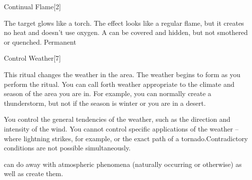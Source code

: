 \begin{spellsection}{Continual Flame}[2]
    \begin{spellheader}
    \end{spellheader}
    \begin{spellcontent}
        \begin{spelltargetinginfo}
        \end{spelltargetinginfo}
        \begin{spelleffects}

            \spelleffect The target glows like a torch. The effect looks like a regular flame, but it creates no heat and doesn't use oxygen. A  can be covered and hidden, but not smothered or quenched.
            \spelldur Permanent
        \end{spelleffects}
    \end{spellcontent}
    \begin{spellfooter}
    \end{spellfooter}
\end{spellsection}

\begin{spellsection}{Control Weather}[7]
    \begin{spellheader}
    \end{spellheader}
    \begin{spellcontent}
        \begin{spelltargetinginfo}
        \end{spelltargetinginfo}
        \begin{spelleffects}

            \spelleffect This ritual changes the weather in the area. The weather begins to form as you perform the ritual. You can call forth weather appropriate to the climate and season of the area you are in. For example, you can normally create a thunderstorm, but not if the season is winter or you are in a desert.
            \par You control the general tendencies of the weather, such as the direction and intensity of the wind. You cannot control specific applications of the weather -- where lightning strikes, for example, or the exact path of a tornado.Contradictory conditions are not possible simultaneously.
            \spelldur \durext
        \end{spelleffects}
    \end{spellcontent}
    \begin{spellfooter}
        \spellnotes {} can do away with atmospheric phenomena (naturally occurring or otherwise) as well as create them.
    \end{spellfooter}
\end{spellsection}

